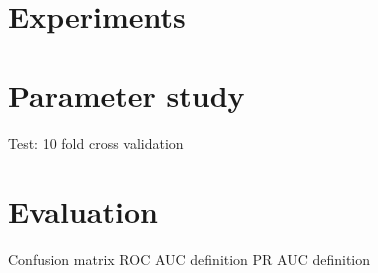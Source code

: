 \documentclass[thesis.tex]{subfiles}
\begin{document}
\section{Experiments}


\section{Parameter study}



Test: 10 fold cross validation

\section{Evaluation}

Confusion matrix
ROC AUC definition
PR AUC definition

\subbibliography
\end{document}

